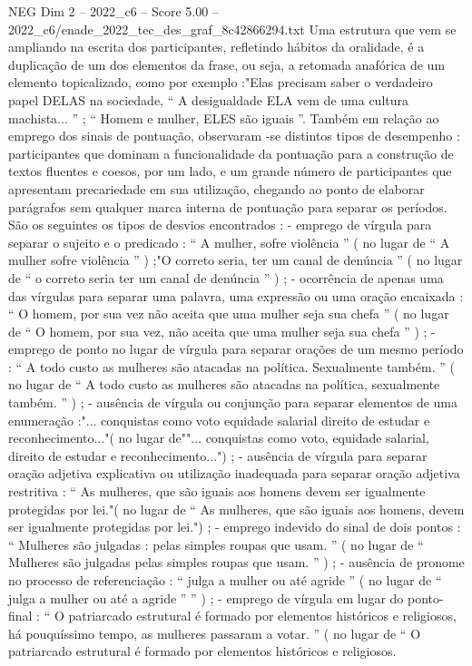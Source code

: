 \begin{textsample}{NEG Dim 2 – 2022\_c6 – Score 5.00 – 2022\_c6/enade\_2022\_tec\_des\_graf\_8c42866294.txt}
Uma estrutura que vem se ampliando na escrita dos participantes, refletindo hábitos da oralidade, é a duplicação de um dos elementos da frase, ou seja, a retomada anafórica de um elemento topicalizado, como por exemplo :"Elas precisam saber o verdadeiro papel DELAS na sociedade, “ A desigualdade ELA vem de uma cultura machista... ” ; “ Homem e mulher, ELES são iguais ”.
Também em relação ao emprego dos sinais de pontuação, observaram -se distintos tipos de desempenho : participantes que dominam a funcionalidade da pontuação para a construção de textos fluentes e coesos, por um lado, e um grande número de participantes que apresentam precariedade em sua utilização, chegando ao ponto de elaborar parágrafos sem qualquer marca interna de pontuação para separar os períodos.
São os seguintes os tipos de desvios encontrados : - emprego de vírgula para separar o sujeito e o predicado : “ A mulher, sofre violência ” ( no lugar de “ A mulher sofre violência ” ) ;"O correto seria, ter um canal de denúncia ” ( no lugar de “ o correto seria ter um canal de denúncia ” ) ; - ocorrência de apenas uma das vírgulas para separar uma palavra, uma expressão ou uma oração encaixada : “ O homem, por sua vez não aceita que uma mulher seja sua chefa ” ( no lugar de “ O homem, por sua vez, não aceita que uma mulher seja sua chefa ” ) ; - emprego de ponto no lugar de vírgula para separar orações de um mesmo período : “ A todo custo as mulheres são atacadas na política.
Sexualmente também. ” ( no lugar de “ A todo custo as mulheres são atacadas na política, sexualmente também. ” ) ; - ausência de vírgula ou conjunção para separar elementos de uma enumeração :"... conquistas como voto equidade salarial direito de estudar e reconhecimento..."( no lugar de""... conquistas como voto, equidade salarial, direito de estudar e reconhecimento...") ; - ausência de vírgula para separar oração adjetiva explicativa ou utilização inadequada para separar oração adjetiva restritiva : “ As mulheres, que são iguais aos homens devem ser igualmente protegidas por lei."( no lugar de “ As mulheres, que são iguais aos homens, devem ser igualmente protegidas por lei.") ; - emprego indevido do sinal de dois pontos : “ Mulheres são julgadas : pelas simples roupas que usam. ” ( no lugar de “ Mulheres são julgadas pelas simples roupas que usam. ” ) ; - ausência de pronome no processo de referenciação : “ julga a mulher ou até agride ” ( no lugar de “ julga a mulher ou até a agride ” ” ) ; - emprego de vírgula em lugar do ponto-final : “ O patriarcado estrutural é formado por elementos históricos e religiosos, há pouquíssimo tempo, as mulheres passaram a votar. ” ( no lugar de “ O patriarcado estrutural é formado por elementos históricos e religiosos.

\end{textsample}
